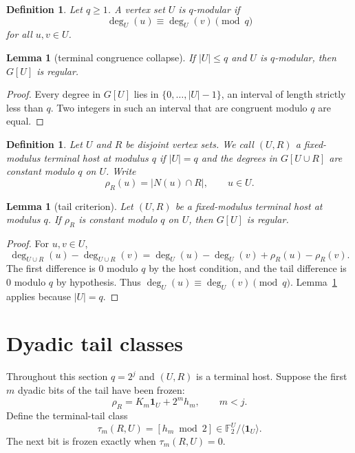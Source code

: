 \documentclass[11pt]{article}
\newtheorem{lemma}[theorem]{Lemma}
\newtheorem{definition}[theorem]{Definition}
\theoremstyle{remark}
\newcommand{\F}{\mathbb F}
\newcommand{\one}{\mathbf 1}
\begin{document}
\begin{definition}
Let \(q\ge 1\).  A vertex set \(U\) is \(q\)-modular if
\[
  \deg_U(u)\equiv\deg_U(v)\pmod q
\]
for all \(u,v\in U\).
\end{definition}

\begin{lemma}[terminal congruence collapse]\label{lem:terminal-collapse}
If \(|U|\le q\) and \(U\) is \(q\)-modular, then \(G[U]\) is regular.
\end{lemma}

\begin{proof}
Every degree in \(G[U]\) lies in \(\{0,\ldots,|U|-1\}\), an interval of length
strictly less than \(q\).  Two integers in such an interval that are congruent
modulo \(q\) are equal.
\end{proof}

\begin{definition}
Let \(U\) and \(R\) be disjoint vertex sets.  We call \((U,R)\) a
fixed-modulus terminal host at modulus \(q\) if \(|U|=q\) and the degrees in
\(G[U\cup R]\) are constant modulo \(q\) on \(U\).  Write
\[
  \rho_R(u)=|N(u)\cap R|,\qquad u\in U.
\]
\end{definition}

\begin{lemma}[tail criterion]\label{lem:tail-criterion}
Let \((U,R)\) be a fixed-modulus terminal host at modulus \(q\).  If
\(\rho_R\) is constant modulo \(q\) on \(U\), then \(G[U]\) is regular.
\end{lemma}

\begin{proof}
For \(u,v\in U\),
\[
  \deg_{U\cup R}(u)-\deg_{U\cup R}(v)
  =\deg_U(u)-\deg_U(v)+\rho_R(u)-\rho_R(v).
\]
The first difference is \(0\) modulo \(q\) by the host condition, and the tail
difference is \(0\) modulo \(q\) by hypothesis.  Thus
\(\deg_U(u)\equiv\deg_U(v)\pmod q\).  Lemma~\ref{lem:terminal-collapse}
applies because \(|U|=q\).
\end{proof}

\section{Dyadic tail classes}

Throughout this section \(q=2^j\) and \((U,R)\) is a terminal host.  Suppose the
first \(m\) dyadic bits of the tail have been frozen:
\[
  \rho_R=K_m\one_U+2^m h_m,\qquad m<j.
\]
Define the terminal-tail class
\[
  \tau_m(R,U)=[h_m\bmod 2]\in \F_2^U/\langle\one_U\rangle.
\]
The next bit is frozen exactly when \(\tau_m(R,U)=0\).
\end{document}
